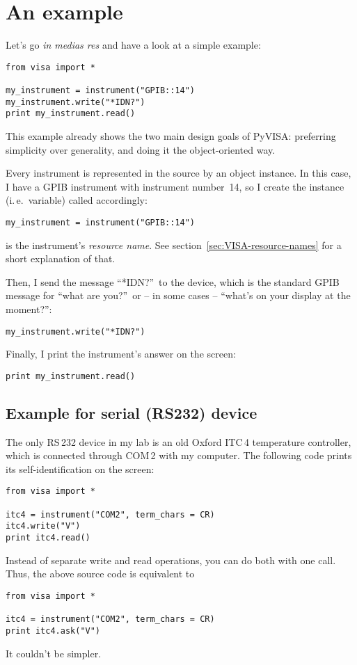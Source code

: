 \documentclass{howto}
\begin{document}
\section{An example}

Let's go \emph{in medias res} and have a look at a simple example:
\begin{verbatim}
from visa import *

my_instrument = instrument("GPIB::14")
my_instrument.write("*IDN?")
print my_instrument.read()
\end{verbatim}
This example already shows the two main design goals of PyVISA: preferring
simplicity over generality, and doing it the object-oriented way.

Every instrument is represented in the source by an object instance.  In this case,
I have a GPIB instrument with instrument number~14, so I create the instance
(i.\,e.\ variable) called  accordingly:
\begin{verbatim}
my_instrument = instrument("GPIB::14")
\end{verbatim}
 is the instrument's \emph{resource name}.  See
section~\ref{sec:VISA-resource-names} for a short explanation of that.

Then, I send the message ``*IDN?''\ to the device, which is the standard GPIB
message for ``what are you?''\ or -- in some cases -- ``what's on your display
at the moment?'':
\begin{verbatim}
my_instrument.write("*IDN?")
\end{verbatim}
Finally, I print the instrument's answer on the screen:
\begin{verbatim}
print my_instrument.read()
\end{verbatim}


\subsection{Example for serial (RS232) device}

The only RS\,232 device in my lab is an old Oxford ITC\,4 temperature
controller, which is connected through COM\,2 with my computer.  The following
code prints its self-identification on the screen:
\begin{verbatim}
from visa import *

itc4 = instrument("COM2", term_chars = CR)
itc4.write("V")
print itc4.read()
\end{verbatim}
Instead of separate write and read operations, you can do both with one
 call.  Thus, the above source code is equivalent to
\begin{verbatim}
from visa import *

itc4 = instrument("COM2", term_chars = CR)
print itc4.ask("V")
\end{verbatim}
It couldn't be simpler.
\end{document}
